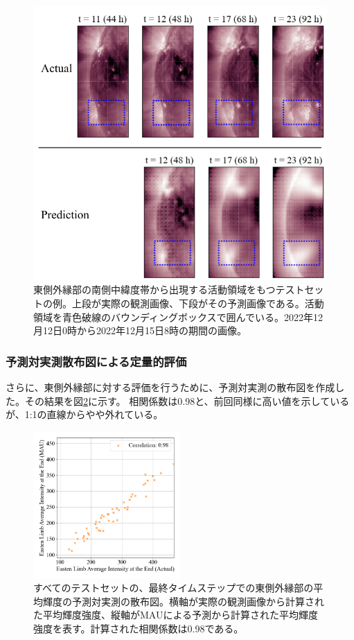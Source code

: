         \begin{figure}[htbp]
          \centering
          \includegraphics[width=\textwidth]{figures/exp2/limb_sample_12_caption.jpg}
          \caption{東側外縁部の南側中緯度帯から出現する活動領域をもつテストセットの例。上段が実際の観測画像、下段がその予測画像である。活動領域を青色破線のバウンディングボックスで囲んでいる。2022年12月12日0時から2022年12月15日8時の期間の画像。}
          \label{fig:exp2_limb_example_2}
        \end{figure}

      \subsubsection{予測対実測散布図による定量的評価}
        さらに、東側外縁部に対する評価を行うために、予測対実測の散布図を作成した。その結果を図\ref{fig:exp2_limb_scatter}に示す。
        相関係数は0.98と、前回同様に高い値を示しているが、1:1の直線からやや外れている。
        \begin{figure}[htbp]
          \centering
          \includegraphics[width=0.5\textwidth]{figures/exp2/limb_scatter_gt_pd.png}
          \caption{すべてのテストセットの、最終タイムステップでの東側外縁部の平均輝度の予測対実測の散布図。横軸が実際の観測画像から計算された平均輝度強度、縦軸がMAUによる予測から計算された平均輝度強度を表す。計算された相関係数は0.98である。}
          \label{fig:exp2_limb_scatter}
        \end{figure}
        
